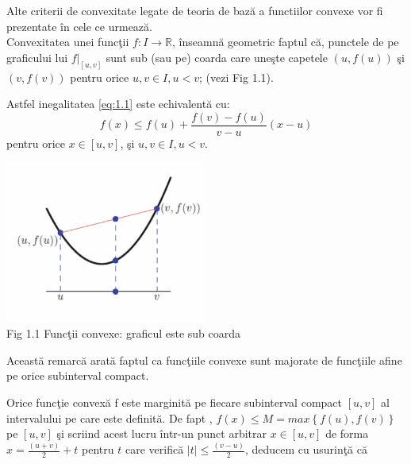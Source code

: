 \documentclass[a4paper,12pt,oneside]{report}
\begin{document}
Alte criterii de convexitate legate de teoria de baz\u{a} a func{t}iilor convexe vor fi prezentate \^{i}n cele ce urmeaz\u{a}.\\

Convexitatea unei func\c{t}ii \(f : I\rightarrow \mathbb{R}\), \^{i}nseamn\u{a} geometric faptul c\u{a}, punctele de pe graficului lui  \(f|_{\left [ u,v \right ]}\) sunt sub (sau pe) coarda care une\c{s}te capetele \(\left ( u , f {\left ( u \right )} \right )\)  \c{s}i \(\left ( v , f {\left ( v \right )} \right )\) pentru orice \(u, v \in I, u < v\);
(vezi Fig 1.1).

Astfel inegalitatea \ref{eq:1.1} este echivalent\u{a} cu:
\begin{displaymath}
  f\left ( x \right )\leq f\left ( u \right ) +\frac{f\left ( v \right )- f\left ( u \right )}{v - u}\left ( x - u \right ) \label{eq:1.2} \tag{1.2}
\end{displaymath}
pentru orice \(x\in \left [  u, v\right ]\), \c{s}i \(u, v \in I, u < v\).

\begin{center}
  \includegraphics[width=0.5\textwidth]{fig1.1.png}
  \\ Fig 1.1 Func\c{t}ii convexe: graficul este sub coarda
\end{center}

Aceast\u{a} remarc\u{a} arat\u{a} faptul ca func\c{t}iile convexe sunt majorate de func\c{t}iile afine pe orice subinterval compact.

Orice func\c{t}ie convex\u{a} f este marginit\u{a} pe fiecare subinterval compact \(\left [ u , v \right ]\) al intervalului pe care este definit\u{a}. De fapt , \(f\left ( x \right ) \leq  M = max \left \{ f\left ( u \right ), f\left ( v \right ) \right \}\)  pe \(\left [ u , v \right ]\)  \c{s}i scriind acest lucru \^{i}ntr-un punct arbitrar \(x\in  \left [ u , v  \right ]\)  de forma  \(x= \frac{\left ( u + v \right )}{2} + t\) pentru  \(t\) care verific\u{a} \(\left | t \right |\leq \frac{\left ( v - u \right )}{2}\), deducem cu usurin\c{t}\u{a} c\u{a}
\end{document}
